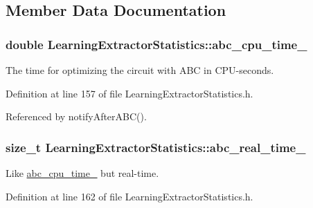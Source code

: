 \subsection{Member Data Documentation}
\hypertarget{classLearningExtractorStatistics_a58056982bf57dbe69cff268d9a9d4a32}{
\subsubsection[{abc\-\_\-cpu\-\_\-time\-\_\-}]{\setlength{\rightskip}{0pt plus 5cm}double Learning\-Extractor\-Statistics\-::abc\-\_\-cpu\-\_\-time\-\_\-\hspace{0.3cm}{\ttfamily [protected]}}}\label{classLearningExtractorStatistics_a58056982bf57dbe69cff268d9a9d4a32}


The time for optimizing the circuit with A\-B\-C in C\-P\-U-\/seconds. 



Definition at line 157 of file Learning\-Extractor\-Statistics.\-h.



Referenced by notify\-After\-A\-B\-C().

\hypertarget{classLearningExtractorStatistics_a4bdc0c5fba7ef60dbf974f212b4b1f17}{
\subsubsection[{abc\-\_\-real\-\_\-time\-\_\-}]{\setlength{\rightskip}{0pt plus 5cm}size\-\_\-t Learning\-Extractor\-Statistics\-::abc\-\_\-real\-\_\-time\-\_\-\hspace{0.3cm}{\ttfamily [protected]}}}\label{classLearningExtractorStatistics_a4bdc0c5fba7ef60dbf974f212b4b1f17}


Like \hyperlink{classLearningExtractorStatistics_a58056982bf57dbe69cff268d9a9d4a32}{abc\-\_\-cpu\-\_\-time\-\_\-} but real-\/time. 



Definition at line 162 of file Learning\-Extractor\-Statistics.\-h.



